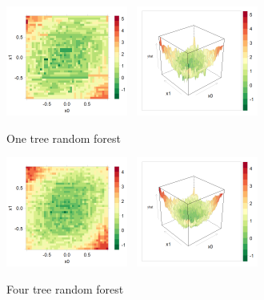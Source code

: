 \documentclass[11pt,openany,american,usenames,dvipsnames,svgnames,x11names,table,isodate]{article}
\numberwithin{equation}{section}
\numberwithin{figure}{section}
\begin{document}
\begin{figure}[t]
\noindent \begin{centering}
\includegraphics[width=40mm]{fig/rf-1-tree-levelplot}~
\includegraphics[width=40mm]{fig/rf-1-tree-wireframe}
\par\end{centering}
\protect\caption{\label{fig:One-tree-random}One tree random forest}
\end{figure}


\begin{figure}
\noindent \begin{centering}
\includegraphics[width=40mm]{fig/rf-4-tree-levelplot}~
\includegraphics[width=40mm]{fig/rf-4-tree-wireframe}
\par\end{centering}
\protect\caption{\label{fig:four-tree-random}Four tree random forest}
\end{figure}
\end{document}
